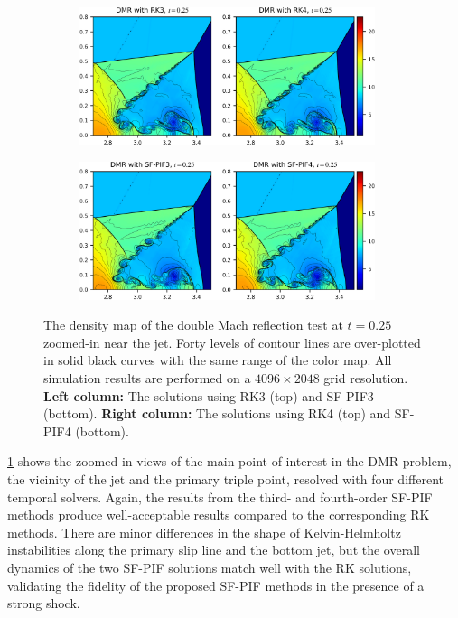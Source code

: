 \begin{figure}
    \centering
    \begin{subfigure}{140mm}
        \centering
        \includegraphics[width=0.95\textwidth]{fig/dmr_weno5_rk_4096y2.png}
    \end{subfigure}
    \begin{subfigure}{140mm}
        \centering
        \includegraphics[width=0.95\textwidth]{fig/dmr_weno5_sf_4096y2.png}
    \end{subfigure}
    \caption{The density map of the double Mach reflection test at \( t = 0.25 \)
        zoomed-in near the jet. Forty levels of contour lines are over-plotted
        in solid black curves with the same range of the color map.
        All simulation results are performed on a
        \( 4096 \times 2048 \) grid resolution.
        \textbf{Left column:} The solutions using RK3 (top) and SF-PIF3 (bottom).
        \textbf{Right column:} The solutions using  RK4 (top) and SF-PIF4 (bottom).
    }\label{fig:dmr}
\end{figure}

\cref{fig:dmr} shows the zoomed-in views of the main point of interest in the DMR problem,
the vicinity of the jet and the primary triple point, resolved with four different temporal solvers.
Again, the results from the third- and fourth-order SF-PIF methods
produce well-acceptable results compared to the corresponding RK methods.
There are minor differences in the shape of Kelvin-Helmholtz instabilities along the
primary slip line and the bottom jet,
but the overall dynamics of the two SF-PIF solutions match well with the RK solutions,
validating the fidelity of the proposed SF-PIF methods in the presence of a strong shock.



